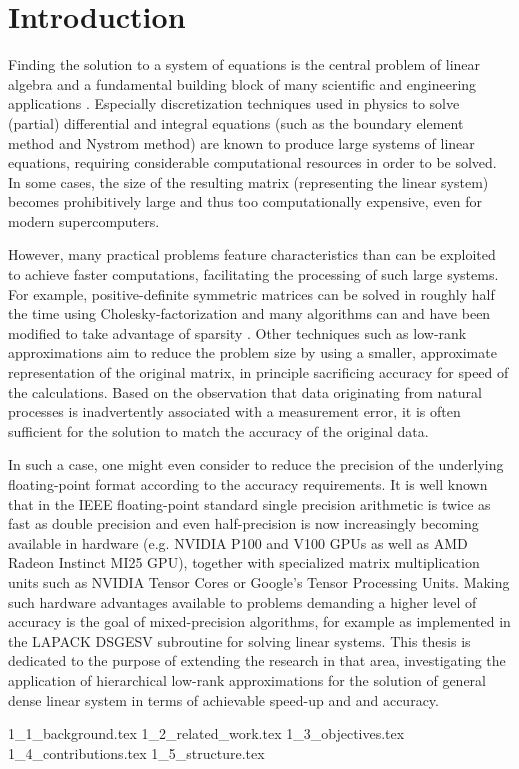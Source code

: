 \chapter{Introduction}
\label{chap:introduction}


Finding the solution to a system of equations is the central problem of linear algebra \cite{strang_introduction_2009} and a fundamental building block of many scientific and engineering applications \cite{carson_new_2017}. Especially discretization techniques used in physics to solve (partial) differential and integral equations (such as the boundary element method and Nystrom method) are known to produce large systems of linear equations, requiring considerable computational resources in order to be solved. In some cases, the size of the resulting matrix (representing the linear system) becomes prohibitively large and thus too computationally expensive, even for modern supercomputers. 

However, many practical problems feature characteristics than can be exploited to achieve faster computations, facilitating the processing of such large systems. For example, positive-definite symmetric matrices can be solved in roughly half the time using Cholesky-factorization and many algorithms can and have been modified to take advantage of sparsity \cite{davis_direct_2006}. Other techniques such as low-rank approximations aim to reduce the problem size by using a smaller, approximate representation of the original matrix, in principle sacrificing accuracy for speed of the calculations. Based on the observation that data originating from natural processes is inadvertently associated with a measurement error, it is often sufficient for the solution to match the accuracy of the original data. 

In such a case, one might even consider to reduce the precision of the underlying floating-point format according to the accuracy requirements. It is well known that in the IEEE floating-point standard \cite{institute_of_electrical_and_electronics_engineers_ieee_2008} single precision arithmetic is twice as fast as double precision \cite{buttari_mixed_2007} and even half-precision is now increasingly becoming available in hardware (e.g. NVIDIA P100 and V100 GPUs as well as AMD Radeon Instinct MI25 GPU), together with specialized matrix multiplication units such as NVIDIA Tensor Cores or Google's Tensor Processing Units. Making such hardware advantages available to problems demanding a higher level of accuracy is the goal of mixed-precision algorithms, for example as implemented in the LAPACK DSGESV \cite{buttari_mixed_2007} subroutine for solving linear systems. This thesis is dedicated to the purpose of extending the research in that area, investigating the application of hierarchical low-rank approximations for the solution of general dense linear system in terms of achievable speed-up and and accuracy. 

{1_1_background.tex}
{1_2_related_work.tex}
{1_3_objectives.tex}
{1_4_contributions.tex}
{1_5_structure.tex}
